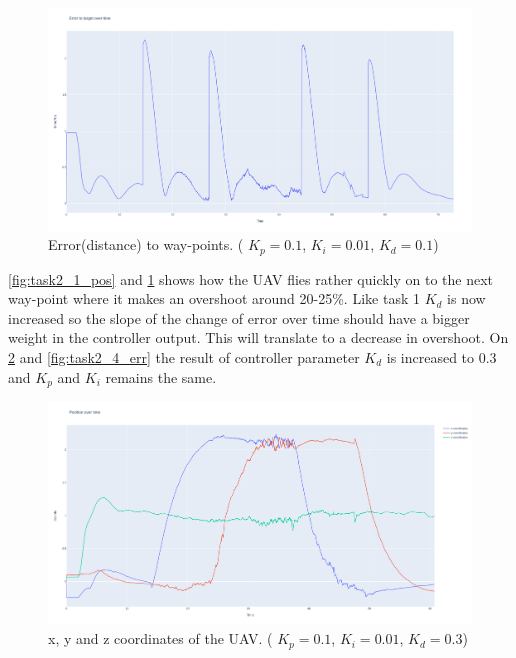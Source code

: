 \documentclass[conference]{IEEEtran}
\begin{document}
\begin{figure}[hbtp]
	\centering
	\includegraphics[width=1.0\linewidth]{images/task2_1_err.png}
	\caption{Error(distance) to way-points. ( $K_p = 0.1$, $K_i = 0.01$, $K_d = 0.1$)}
	\label{fig:task2_1_err}
\end{figure}

\cref{fig:task2_1_pos} and \cref{fig:task2_1_err} shows how the UAV flies rather quickly on to the next way-point where it makes an overshoot around 20-25\%. 
Like task 1 $K_d$ is now increased so the slope of the change of error over time should have a bigger weight in the controller output. This will translate to a decrease in overshoot. On \cref{fig:task2_4_pos} and \cref{fig:task2_4_err} the result of controller parameter $K_d$ is increased to 0.3 and $K_p$ and $K_i$ remains the same. 


\begin{figure}[hbtp]
	\centering
	\includegraphics[width=1.0\linewidth]{images/task2_4_pos.png}
	\caption{x, y and z coordinates of the UAV. ( $K_p = 0.1$, $K_i = 0.01$, $K_d = 0.3$)}
	\label{fig:task2_4_pos}
\end{figure}
\end{document}
